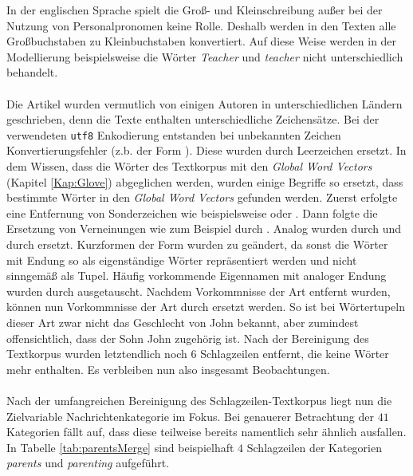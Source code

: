 \documentclass[a4paper,11pt]{article}
\begin{document}
In der englischen Sprache spielt die Groß- und Kleinschreibung außer bei der Nutzung von Personalpronomen keine Rolle. Deshalb werden in den Texten alle Großbuchstaben zu Kleinbuchstaben konvertiert. Auf diese Weise werden in der Modellierung beispielsweise die Wörter \textit{Teacher} und \textit{teacher} nicht unterschiedlich behandelt. \\
\\
Die Artikel wurden vermutlich von einigen Autoren in unterschiedlichen Ländern geschrieben, denn die Texte enthalten unterschiedliche Zeichensätze. Bei der verwendeten \texttt{utf8} Enkodierung entstanden bei unbekannten Zeichen Konvertierungsfehler (z.b. der Form ). Diese wurden durch Leerzeichen ersetzt. In dem Wissen, dass die Wörter des Textkorpus mit den \textit{Global Word Vectors} (Kapitel \ref{Kap:Glove}) abgeglichen werden, wurden einige Begriffe so ersetzt, dass bestimmte Wörter in den \textit{Global Word Vectors} gefunden werden. Zuerst erfolgte eine Entfernung von Sonderzeichen wie beispielsweise  oder . Dann folgte die Ersetzung von Verneinungen wie zum Beispiel  durch . Analog wurden  durch  und  durch  ersetzt. Kurzformen der Form  wurden zu  geändert, da sonst die Wörter mit Endung  so als eigenständige Wörter repräsentiert werden und nicht sinngemäß als Tupel. Häufig vorkommende Eigennamen mit analoger Endung  wurden durch  ausgetauscht. Nachdem Vorkommnisse der Art  entfernt wurden, können nun Vorkommnisse der Art  durch  ersetzt werden. So ist bei Wörtertupeln dieser Art zwar nicht das Geschlecht von John bekannt, aber zumindest offensichtlich, dass der Sohn John zugehörig ist. Nach der Bereinigung des Textkorpus wurden letztendlich noch $6$ Schlagzeilen entfernt, die keine Wörter mehr enthalten. Es verbleiben nun also insgesamt  Beobachtungen.\\
\\
Nach der umfangreichen Bereinigung des Schlagzeilen-Textkorpus liegt nun die Zielvariable Nachrichtenkategorie im Fokus.
Bei genauerer Betrachtung der $41$ Kategorien fällt auf, dass diese teilweise bereits namentlich sehr ähnlich ausfallen. In Tabelle \ref{tab:parentsMerge} sind beispielhaft $4$ Schlagzeilen der Kategorien \textit{parents} und \textit{parenting} aufgeführt.
\end{document}
